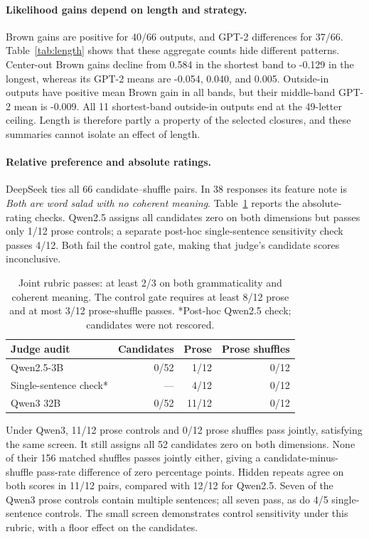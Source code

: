 \documentclass[11pt]{article}
\begin{document}
\paragraph{Likelihood gains depend on length and strategy.}
Brown gains are positive for 40/66 outputs, and GPT-2 differences for 37/66. Table~\ref{tab:length} shows that these aggregate counts hide different patterns. Center-out Brown gains decline from 0.584 in the shortest band to -0.129 in the longest, whereas its GPT-2 means are -0.054, 0.040, and 0.005. Outside-in outputs have positive mean Brown gain in all bands, but their middle-band GPT-2 mean is -0.009. All 11 shortest-band outside-in outputs end at the 49-letter ceiling. Length is therefore partly a property of the selected closures, and these summaries cannot isolate an effect of length.

\paragraph{Relative preference and absolute ratings.}
DeepSeek ties all 66 candidate--shuffle pairs. In 38 responses its feature note is \emph{Both are word salad with no coherent meaning}. Table~\ref{tab:judges} reports the absolute-rating checks. Qwen2.5 assigns all candidates zero on both dimensions but passes only 1/12 prose controls; a separate post-hoc single-sentence sensitivity check passes 4/12. Both fail the control gate, making that judge's candidate scores inconclusive.

\begin{table}[t]
\centering
\small
\setlength{\tabcolsep}{3pt}
\begin{tabular}{@{}lrrr@{}}
\toprule
Judge audit & Candidates & Prose & Prose shuffles \\
\midrule
Qwen2.5-3B & 0/52 & 1/12 & 0/12 \\
Single-sentence check* & --- & 4/12 & 0/12 \\
Qwen3 32B & 0/52 & 11/12 & 0/12 \\
\bottomrule
\end{tabular}
\caption{Joint rubric passes: at least 2/3 on both grammaticality and coherent meaning. The control gate requires at least 8/12 prose and at most 3/12 prose-shuffle passes. *Post-hoc Qwen2.5 check; candidates were not rescored.}
\label{tab:judges}
\end{table}

Under Qwen3, 11/12 prose controls and 0/12 prose shuffles pass jointly, satisfying the same screen. It still assigns all 52 candidates zero on both dimensions. None of their 156 matched shuffles passes jointly either, giving a candidate-minus-shuffle pass-rate difference of zero percentage points. Hidden repeats agree on both scores in 11/12 pairs, compared with 12/12 for Qwen2.5. Seven of the Qwen3 prose controls contain multiple sentences; all seven pass, as do 4/5 single-sentence controls. The small screen demonstrates control sensitivity under this rubric, with a floor effect on the candidates.
\end{document}

